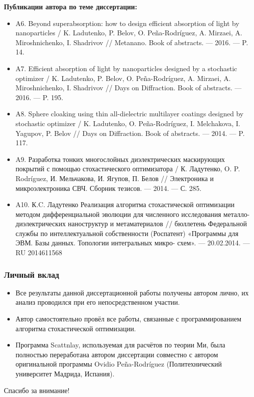 \documentclass[14pt]{beamer}
\begin{document}
\begin{frame}
  \scriptsize 
  \textbf{Публикации автора по теме диссертации:}
  \begin{itemize}
  \item A6. Beyond superabsorption: how to design efficient absorption of light by
nanoparticles / K. Ladutenko, P. Belov, O. Peña-Rodríguez, A. Mirzaei,
A. Miroshnichenko, I. Shadrivov // Metanano. Book of abstracts. — 2016. —
P. 14.
\item 
A7. Efficient absorption of light by nanoparticles designed by a stochastic optimizer / K. Ladutenko, P. Belov, O. Peña-Rodríguez, A. Mirzaei, A. Miroshnichenko, I. Shadrivov // Days on Diffraction. Book of abstracts. — 2016. —
P. 195.
\item A8. Sphere cloaking using thin all-dielectric multilayer coatings designed by
stochastic optimizer / K. Ladutenko, O. Peña-Rodríguez, I. Melchakova, I.
Yagupov, P. Belov // Days on Diffraction. Book of abstracts. — 2014. —
P. 117.
\item A9. Разработка тонких многослойных диэлектрических маскирующих покрытий с помощью стохастического оптимизатора / К. Ладутенко, O. P.
Rodríguez, И. Мельчакова, И. Ягупов, П. Белов // Электроника и
микроэлектроника СВЧ. Сборник тезисов. — 2014. — С. 285.
\item 
A10. К.C. Ладутенко Реализация алгоритма стохастической оптимизации
методом дифференциальной эволюции для численного исследования
металло-диэлектрических наноструктур и метаматериалов // бюллетень
Федеральной службы по интеллектуальной собственности (Роспатент)
«Программы для ЭВМ. Базы данных. Топологии интегральных микро-
схем». — 20.02.2014. — RU 2014611568
\end{itemize}
\end{frame}



\begin{frame}
  \frametitle{Личный вклад}
  \small
      \begin{center}
  \begin{itemize}
  \item Все результаты данной диссертационной работы получены автором
    лично, их анализ проводился при его непосредственном участии.
  \item Автор самостоятельно провёл все работы, связанные с
    программированием алгоритма стохастической оптимизации.
  \item Программа Scattnlay, используемая для расчётов по теории Ми,
    была полностью переработана автором диссертации совместно с
    автором оригинальной программы Ovidio Pe\~{n}a-Rodr\'{i}guez
    (Политехнический университет Мадрида, Испания).
  \end{itemize}
\end{center}
\end{frame}

\begin{frame} 
\begin{center}
Спасибо за внимание!
\end{center}
\end{frame}
\end{document}
